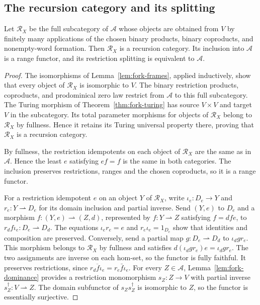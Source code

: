 \subsection{The recursion category and its splitting}

\begin{proposition}\label{prop:fork-recursion}
Let $\mathscr R_X$ be the full subcategory of $\mathcal A$
whose objects are obtained from $V$ by finitely many applications
of the chosen binary products, binary coproducts, and nonempty-word formation.
Then $\mathscr R_X$ is a recursion category. Its inclusion
into $\mathcal A$ is a range functor, and its restriction
splitting is equivalent to $\mathcal A$.
\end{proposition}
\begin{proof}
The isomorphisms of Lemma~\ref{lem:fork-frames}, applied inductively,
show that every object of $\mathscr R_X$ is isomorphic to $V$.
The binary restriction products, coproducts, and prodominical
zero law restrict from $\mathcal A$ to this full subcategory.
The Turing morphism of Theorem~\ref{thm:fork-turing} has
source $V\times V$ and target $V$ in the subcategory.
Its total parameter morphisms for objects of $\mathscr R_X$ belong
to $\mathscr R_X$ by fullness. Hence it retains its Turing
universal property there, proving that $\mathscr R_X$ is a
recursion category.

By fullness, the restriction idempotents on each object of $\mathscr R_X$
are the same as in $\mathcal A$. Hence the least $e$ satisfying $ef=f$
is the same in both categories. The inclusion preserves restrictions,
ranges and the chosen coproducts, so it is a range functor.

For a restriction idempotent $e$ on an object $Y$ of $\mathscr R_X$,
write $\iota_e:D_e\to Y$ and $r_e:Y\rightharpoonup D_e$ for its
domain inclusion and partial inverse. Send $(Y,e)$ to $D_e$
and a morphism $f:(Y,e)\rightharpoonup(Z,d)$, represented by
$f:Y\rightharpoonup Z$ satisfying $f=dfe$, to
$r_d f \iota_e:D_e\rightharpoonup D_d$.
The equations $\iota_er_e=e$ and $r_e\iota_e=1_{D_e}$ show that
identities and composition are preserved. Conversely, send a
partial map $g:D_e\rightharpoonup D_d$ to $\iota_d g r_e$.
This morphism belongs to $\mathscr R_X$ by fullness and satisfies
$d(\iota_d g r_e)e=\iota_d g r_e$. The two assignments are inverse on
each hom-set, so the functor is fully faithful.
It preserves restrictions, since
$\overline{r_d f \iota_e}=r_e\bar f \iota_e$.
For every $Z\in\mathcal A$, Lemma~\ref{lem:fork-dominance}
provides a restriction monomorphism $s_Z:Z\to V$ with partial inverse
$s_Z^\dagger:V\rightharpoonup Z$. The domain subfunctor of
$s_Zs_Z^\dagger$ is isomorphic to $Z$,
so the functor is essentially surjective.
\end{proof}

